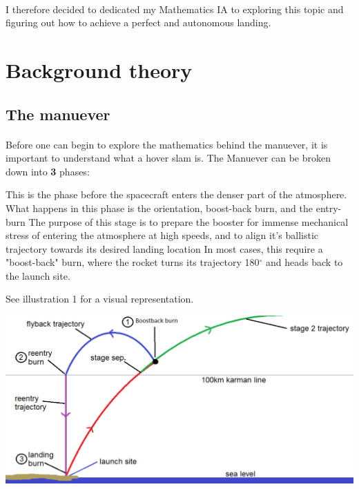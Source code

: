 \documentclass[12pt]{article}
\begin{document}
    \paragraph{\noindent}
        I therefore decided to dedicated my Mathematics IA to exploring this topic and figuring out how to achieve a perfect and autonomous landing.

    

    \section{Background theory}
        \subsection{The manuever}
        \paragraph{}
        Before one can begin to explore the mathematics behind the manuever, it is important to understand what a hover slam is.
        The Manuever can be broken down into \textbf{3} phases: 
            



    This is the phase before the spacecraft enters the denser part of the atmosphere. What happens in this phase is the orientation, boost-back burn, and the entry-burn
    The purpose of this stage is to prepare the booster for immense mechanical stress of entering the atmosphere at high speeds, and to align it's ballistic trajectory towards its desired landing location
    In most cases, this require a "boost-back" burn, where the rocket turns its trajectory 180{$^\circ $} and heads back to the launch site. 
    
    \noindent See illustration 1 for a visual representation.
    
    \begin{center}
        \includegraphics[scale=0.5]{Trajectory-landing.png}
    \end{center}
\end{document}
